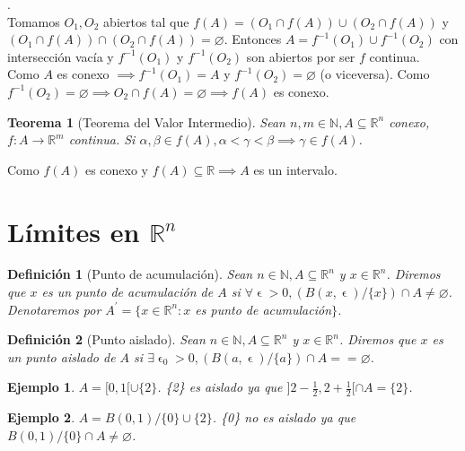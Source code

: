 \documentclass[11pt, a4paper]{article}
\makeatletter
\newif\IfInSansMode
\let\oldsf\sffamily
\renewcommand*{\sffamily}{\oldsf\mathversion{sans}\InSansModetrue}
\let\oldnorm\normalfont
\renewcommand*{\normalfont}{\oldnorm\InSansModefalse\mathversion{normal}}
\let\epsilon\upvarepsilon
\newcommand{\R}{\mathbb{R}} \newcommand{\N}{\mathbb{N}}
\renewenvironment{proof}[1][\proofname] {\par\pushQED{\qed}\normalfont\topsep6\p@\@plus6\p@\relax\trivlist\item[\hskip\labelsep\itshape\sffamily#1\@addpunct{.}]\ignorespaces}{\popQED\endtrivlist\@endpefalse}
\theoremstyle{theorem-style}
\newtheorem{nth}{Teorema}[section]
\theoremstyle{definition-style}
\newtheorem{ndef}{Definición}[section]
\theoremstyle{remark-style}
\theoremstyle{example-style}
\newtheorem{ejemplo}{Ejemplo}[section]
\makeatother
\begin{document}
\begin{proof}.
\\ Tomamos $O_1,O_2$ abiertos tal que $f(A)=(O_1 \cap f(A)) \cup (O_2 \cap f(A))$ y $(O_1 \cap f(A)) \cap (O_2 \cap f(A)) = \varnothing$. Entonces $A= f^{-1}(O_1) \cup f^{-1}(O_2)$ con intersección vacía y $f^{-1}(O_1) $ y $ f^{-1}(O_2)$ son abiertos por ser $f$ continua. \\

Como $A$ es conexo $ \implies f^{-1}(O_1)=A$ y $f^{-1}(O_2)=\varnothing$ (o viceversa). Como $ f^{-1}(O_2)=\varnothing \implies O_2 \cap f(A) = \varnothing \implies f(A)$ es conexo.
\end{proof}

\begin{nth}[Teorema del Valor Intermedio]
Sean $n,m \in \N, A \subseteq \R^n$ conexo, $f:A \to \R^m$ continua. Si $\alpha,\beta \in f(A), \alpha < \gamma < \beta \implies \gamma \in f(A)$.
\end{nth}

\begin{proof}
Como $f(A)$ es conexo y $f(A) \subseteq \R \implies A$ es un intervalo.
\end{proof}

\section{Límites en $\R^n$}

\begin{ndef}[Punto de acumulación]
Sean $n \in \N, A \subseteq \R^n$ y $x \in \R^n$. Diremos que $x$ es un punto de acumulación de $A$ si $ \forall \epsilon > 0, (B(x,\epsilon)/\{x\}) \cap A \ne \varnothing$. Denotaremos por $A^{'} = \{x \in \R^n: x$ es punto de acumulación$\}$.
\end{ndef}

\begin{ndef}[Punto aislado]
	Sean $n \in \N, A \subseteq \R^n$ y $x \in \R^n$. Diremos que $x$ es un punto aislado de $A$ si $ \exists \epsilon_0 > 0, (B(a,\epsilon)/\{a\}) \cap A == \varnothing$.  
\end{ndef}

\begin{ejemplo}
$ A = [0,1[ \cup \{2\}$. \{2\} es aislado ya que $ ]2-\frac{1}{2},2+\frac{1}{2}[ \cap A = \{2\}$.
\end{ejemplo}

\begin{ejemplo}
	$ A = B(0,1)/\{0\} \cup \{2\}$. \{0\} no es aislado ya que $ B(0,1)/\{0\} \cap A \ne \varnothing$.
\end{ejemplo}
\end{document}
